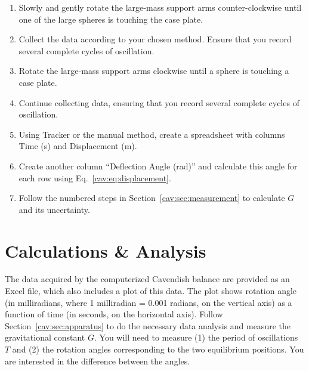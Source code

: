 \begin{enumerate}
	\item Slowly and gently rotate the large-mass support arms counter-clockwise until one of the large spheres is touching the case plate.
	
	\item Collect the data according to your chosen method. Ensure that you record several complete cycles of oscillation.
	
	\item Rotate the large-mass support arms clockwise until a sphere is touching a case plate.
	
	\item Continue collecting data, ensuring that you record several complete cycles of oscillation.
	
	\item Using Tracker or the manual method, create a spreadsheet with columns Time (s) and Displacement (m).
	
	\item Create another column ``Deflection Angle (rad)'' and calculate this angle for each row using Eq.~\ref{cav:eq:displacement}.
	
	\item Follow the numbered steps in Section~\ref{cav:sec:measurement} to calculate $G$ and its uncertainty.
\end{enumerate}

\section{Calculations \& Analysis}

The data acquired by the computerized Cavendish balance are provided as an Excel file,
which also includes a plot of this data. The plot shows rotation angle (in milliradians, where 1 milliradian =
0.001 radians, on the vertical axis) as a function of time (in seconds, on the horizontal axis). Follow
Section~\ref{cav:sec:apparatus} to do the necessary data analysis and measure the gravitational constant $G$. You
will need to measure (1) the period of oscillations $T$ and (2) the rotation angles
corresponding to the two equilibrium positions. You are interested in the difference
between the angles.

